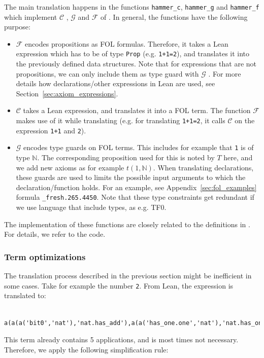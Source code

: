 \documentclass[a4paper]{article}
\newcommand{\F}[0]{$\mathcal{F}$ }
\newcommand{\G}[0]{$\mathcal{G}$ }
\newcommand{\C}[0]{$\mathcal{C}$ }
\begin{document}
The main translation happens in the functions \texttt{hammer\_c}, \texttt{hammer\_g} and \texttt{hammer\_f} which implement \C, \G and \F of \cite{CoqHammer}. In general, the functions have the following purpose:
\begin{itemize}
	\item \F encodes propositions as FOL formulas. Therefore, it takes a Lean expression which has to be of type \texttt{Prop} (e.g. \texttt{1+1=2}), and translates it into the previously defined data structures. Note that for expressions that are not propositions, we can only include them as type guard with \G. For more details how declarations/other expressions in Lean are used, see Section~\ref{sec:axiom_expressions}.
	\item \C takes a Lean expression, and translates it into a FOL term. The function \F makes use of it while translating (e.g. for translating \texttt{1+1=2}, it calls \C on the expression \texttt{1+1} and \texttt{2}).
	\item \G encodes type guards on FOL terms. This includes for example that \texttt{1} is of type $\mathbb{N}$. The corresponding proposition used for this is noted by $T$ here, and we add new axioms as for example $t(1,\mathbb{N})$. When translating declarations, these guards are used to limits the possible input arguments to which the declaration/function holds. For an example, see Appendix~\ref{sec:fol_examples} formula \texttt{\_fresh.265.4450}. Note that these type constraints get redundant if we use language that include types, as e.g. TF0. 
\end{itemize}

The implementation of these functions are closely related to the definitions in \cite{CoqHammer}. For details, we refer to the code.

\subsubsection{Term optimizations}

The translation process described in the previous section might be inefficient in some cases. Take for example the number \texttt{2}. From Lean, the expression is translated to:

\begin{verbatim}
	a(a(a('bit0','nat'),'nat.has_add'),a(a('has_one.one','nat'),'nat.has_one'))
\end{verbatim}

This term already contains 5 applications, and is most times not necessary.  Therefore, we apply the following simplification rule:
\end{document}
